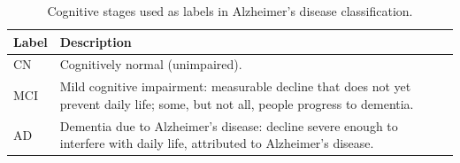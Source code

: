 \begin{table}[t]
  \centering
  \caption{Cognitive stages used as labels in Alzheimer's disease classification.}
  \label{tab:ad_stages}
  \small
  \begin{tabular}{@{}p{}p{}@{}}
    \toprule
    Label & Description \\
    \midrule
    CN  & Cognitively normal (unimpaired). \\
    MCI & Mild cognitive impairment: measurable decline that does not yet prevent daily life; some, but not all, people progress to dementia. \\
    AD  & Dementia due to Alzheimer's disease: decline severe enough to interfere with daily life, attributed to Alzheimer's disease. \\
    \bottomrule
  \end{tabular}
\end{table}
